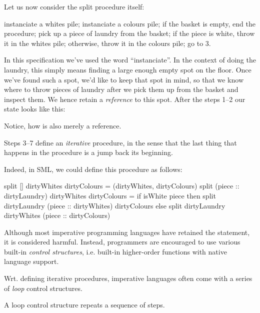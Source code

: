 Let us now consider the split procedure itself:

\begin{codebox}
\li instanciate a whites pile;
\li instanciate a colours pile;
\zi  
\li if the basket is empty, end the procedure;
\zi  
\li pick up a piece of laundry from the basket;
\li if the piece is white, throw it in the whites pile;
\li otherwise, throw it in the colours pile;
\zi  
\li go to 3.
\end{codebox}

In this specification we've used the word ``instanciate''. In the context of
doing the laundry, this simply means finding a large enough empty spot on the
floor. Once we've found such a spot, we'd like to keep that spot in mind, so
that we know where to throw pieces of laundry after we pick them up from the
basket and inspect them. We hence retain a \emph{reference} to this spot.
After the steps 1--2 our state looks like this:

\begin{codebox}
\end{codebox}

Notice, how  is also merely a reference.

Steps 3--7 define an \emph{iterative} procedure, in the sense that the last
thing that happens in the procedure is a jump back its beginning.

Indeed, in SML, we could define this procedure as follows:

\begin{code}
split [] dirtyWhites dirtyColours =
  (dirtyWhites, dirtyColours)
split (piece :: dirtyLaundry) dirtyWhites dirtyColours =
  if isWhite piece
  then
    split dirtyLaundry (piece :: dirtyWhites) dirtyColours
  else
    split dirtyLaundry dirtyWhites (piece :: dirtyColours)
\end{code}

Although most imperative programming languages have retained the 
statement, it is considered harmful. Instead, programmers are encouraged to use
various built-in \emph{control structures}, i.e. built-in higher-order
functions with native language support.

Wrt. defining iterative procedures, imperative languages often come with a
series of \emph{loop} control structures.

\begin{definition}

A loop control structure repeats a sequence of steps.

\end{definition}

